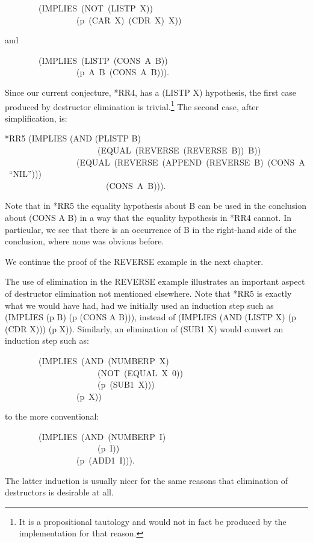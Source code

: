 \documentclass[10pt]{book}
\newenvironment{pubasis}{\begin{flushleft}}{\end{flushleft}}
\begin{document}
\begin{pubasis}
~~~~~~~~(IMPLIES~(NOT~(LISTP~X))\\
~~~~~~~~~~~~~~~~~(p~(CAR~X)~(CDR~X)~X))\\
\end{pubasis}
and
\begin{pubasis}
~~~~~~~~(IMPLIES~(LISTP~(CONS~A~B))\\
~~~~~~~~~~~~~~~~~(p~A~B~(CONS~A~B))).\\
\end{pubasis}
Since our current conjecture, *RR4, has a (LISTP X) hypothesis, the first
case produced by destructor elimination is trivial.\footnote{It is a propositional tautology and would not in fact be produced by the implementation for that reason.}  The second case, after simplification, is:

\begin{pubasis}
*RR5	(IMPLIES (AND (PLISTP B)\\
~~~~~~~~~~~~~~~~~~~~~~(EQUAL~(REVERSE~(REVERSE~B))~B))\\
~~~~~~~~~~~~~~~~~(EQUAL~(REVERSE~(APPEND~(REVERSE~B)~(CONS~A~``NIL'')))\\
~~~~~~~~~~~~~~~~~~~~~~~~(CONS~A~B))).\\
\end{pubasis}
Note that in *RR5  the equality hypothesis about B can be used in
the conclusion about (CONS A B) in a way that the equality
hypothesis in *RR4 cannot.  In particular, we see that there is an occurrence of B
in the right-hand side of the conclusion, where none was obvious before.

We continue the proof of the REVERSE example in the
next chapter.

The use of elimination in the REVERSE example illustrates an important aspect of destructor elimination
not mentioned elsewhere.  Note that *RR5 is exactly what we would have
had, had we initially used an induction step such as (IMPLIES (p B) (p (CONS A B))),
instead of (IMPLIES (AND (LISTP X) (p (CDR X))) (p X)).  Similarly, an elimination
of (SUB1 X) would convert an induction step such as:

\begin{pubasis}
~~~~~~~~(IMPLIES~(AND~(NUMBERP~X)\\
~~~~~~~~~~~~~~~~~~~~~~(NOT~(EQUAL~X~0))\\
~~~~~~~~~~~~~~~~~~~~~~(p~(SUB1~X)))\\
~~~~~~~~~~~~~~~~~(p~X))\\
\end{pubasis}
to the more conventional:
\begin{pubasis}
~~~~~~~~(IMPLIES~(AND~(NUMBERP~I)\\
~~~~~~~~~~~~~~~~~~~~~~(p~I))\\
~~~~~~~~~~~~~~~~~(p~(ADD1~I))).\\
\end{pubasis}
The latter induction is usually nicer for the same reasons that
elimination of destructors is desirable at all.
\end{document}
